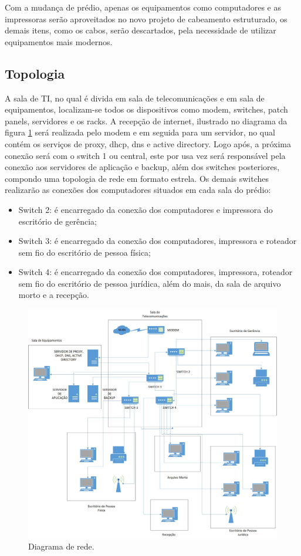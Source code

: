 \documentclass[	DIV=calc,%
							paper=a4,%
							fontsize=12pt,%
							onecolumn]{scrartcl}	 					%
\begin{document}
Com a mudança de prédio, apenas os equipamentos como computadores e as impressoras serão aproveitados no novo projeto de cabeamento estruturado, os demais itens, como os cabos, serão descartados, pela necessidade de utilizar equipamentos mais modernos.

\subsection{Topologia}
A sala de TI, no qual é divida em sala de telecomunicações e em sala de equipamentos, localizam-se todos os dispositivos como modem, switches, patch panels, servidores e os racks. A recepção de internet, ilustrado no diagrama da figura \ref{diagrama1} será realizada pelo modem e em seguida para um servidor, no qual contém os serviços de proxy, dhcp, dns e active directory. Logo após, a próxima conexão será com o switch 1 ou central, este por usa vez será responsável pela conexão aos servidores de aplicação e backup, além dos switches posteriores, compondo uma topologia de rede em formato estrela. Os demais switches realizarão as conexões dos computadores situados em cada sala do prédio:
\begin{itemize}
	\item Switch 2: é encarregado da conexão dos computadores e impressora do escritório de gerência;
	\item Switch 3: é encarregado da conexão dos computadores, impressora e roteador sem fio do escritório de pessoa física;
	\item Switch 4: é encarregado da conexão dos computadores, impressora, roteador sem fio do escritório de pessoa jurídica, além do mais, da sala de arquivo morto e a recepção.
\end{itemize}

\begin{figure}[h]
	\centering
	\includegraphics[scale=0.45]{diagrama1}
	\caption{Diagrama de rede.}
	\label{diagrama1}
\end{figure}
\end{document}
